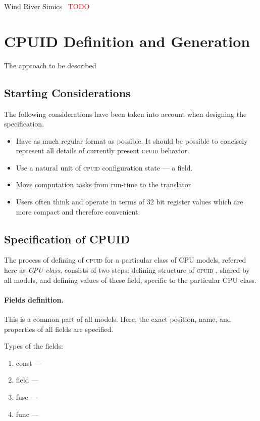 \documentclass[a4paper,10pt,oneside,unicode]{article}
\newcommand{\cpuid}{\textsc{cpuid} }
\newcommand{\todo}[1][]{\textcolor{red}{TODO #1}}
\begin{document}
Wind River Simics~\cite{simics} \todo

\section{CPUID Definition and Generation}\label{sec:cpuidgen}

The approach to be described 

\subsection{Starting Considerations}

The following considerations have been taken into account when designing the specification.

\begin{itemize}
\item Have as much regular format as possible. It should be possible to concisely represent all details of currently present \cpuid behavior.
\item Use a natural unit of \cpuid configuration state --- a field.
\item Move computation tasks from run-time to the translator
\item Users often think and operate in terms of 32 bit register values which are more compact and therefore convenient.
\end{itemize}


\subsection{Specification of CPUID}

The process of defining of \cpuid for a particular class of CPU models, referred here as \emph{CPU class}, consists of two steps: defining structure of \cpuid, shared by all models, and defining values of these field, specific to the particular CPU class.

\paragraph{Fields definition.} This is a common part of all models. Here, the exact position, name, and properties of all fields are specified.

Types of the fields:
\begin{enumerate}
    \item const ---
    \item field ---
    \item fuse ---
    \item func --- 
\end{enumerate}
\end{document}
